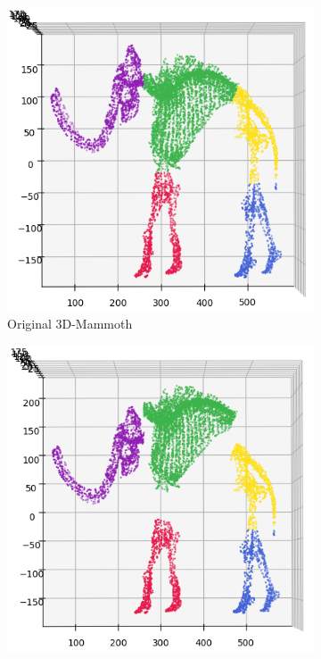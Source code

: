 \begin{figure}[!]
     \centering
     \begin{subfigure}[t]{0.45\columnwidth}
    	\centering
    	\includegraphics[width=\columnwidth]{images/mammoth_original_plot.png}
    	\caption{Original 3D-Mammoth}
        \label{fig:mammoth_original_plot}
    \end{subfigure}
     \hfill
     \begin{subfigure}[t]{0.45\columnwidth}
    	\centering
    	\includegraphics[width=\columnwidth]{images/mammoth_trans_plot.png}

\end{subfigure}
\end{figure}

